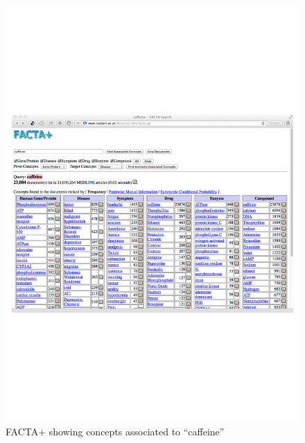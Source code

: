 \begin{figure}
\begin{center}
\includegraphics[scale=0.6]{figures/facta.pdf}
 \caption{FACTA+ showing concepts associated to ``caffeine'' }
\label{fig:facta}
\end{center}
\end{figure}
  
